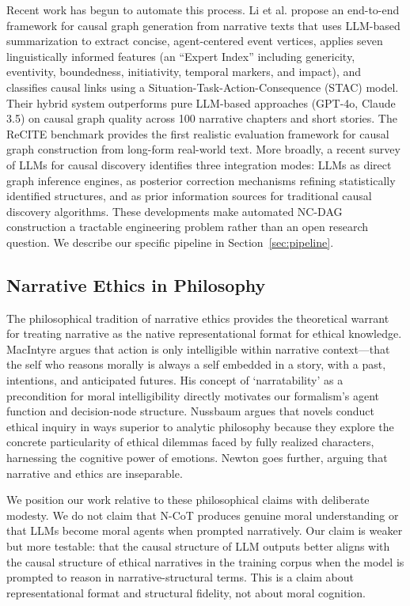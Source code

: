 \documentclass[11pt,letterpaper]{article}
\theoremstyle{defn}
\begin{document}
Recent work has begun to automate this process. Li et al. \citeyearpar{li2025} propose an end-to-end framework for causal graph generation from narrative texts that uses LLM-based summarization to extract concise, agent-centered event vertices, applies seven linguistically informed features (an ``Expert Index'' including genericity, eventivity, boundedness, initiativity, temporal markers, and impact), and classifies causal links using a Situation-Task-Action-Consequence (STAC) model. Their hybrid system outperforms pure LLM-based approaches (GPT-4o, Claude 3.5) on causal graph quality across 100 narrative chapters and short stories. The ReCITE benchmark \citep{recite2025} provides the first realistic evaluation framework for causal graph construction from long-form real-world text. More broadly, a recent survey of LLMs for causal discovery identifies three integration modes: LLMs as direct graph inference engines, as posterior correction mechanisms refining statistically identified structures, and as prior information sources for traditional causal discovery algorithms. These developments make automated NC-DAG construction a tractable engineering problem rather than an open research question. We describe our specific pipeline in Section~\ref{sec:pipeline}.

\subsection{Narrative Ethics in Philosophy}

The philosophical tradition of narrative ethics provides the theoretical warrant for treating narrative as the native representational format for ethical knowledge. MacIntyre \citeyearpar{macintyre1981,macintyre2016} argues that action is only intelligible within narrative context---that the self who reasons morally is always a self embedded in a story, with a past, intentions, and anticipated futures. His concept of `narratability' as a precondition for moral intelligibility directly motivates our formalism's agent function and decision-node structure. Nussbaum \citeyearpar{nussbaum1990,nussbaum1997} argues that novels conduct ethical inquiry in ways superior to analytic philosophy because they explore the concrete particularity of ethical dilemmas faced by fully realized characters, harnessing the cognitive power of emotions. Newton \citeyearpar{newton1995} goes further, arguing that narrative and ethics are inseparable.

We position our work relative to these philosophical claims with deliberate modesty. We do not claim that N-CoT produces genuine moral understanding or that LLMs become moral agents when prompted narratively. Our claim is weaker but more testable: that the causal structure of LLM outputs better aligns with the causal structure of ethical narratives in the training corpus when the model is prompted to reason in narrative-structural terms. This is a claim about representational format and structural fidelity, not about moral cognition.
\end{document}
